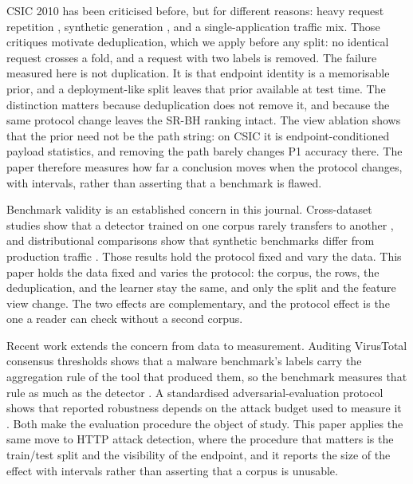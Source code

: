 \documentclass[preprint,11pt]{elsarticle}
\begin{document}
CSIC 2010 has been criticised before, but for different reasons: heavy
request repetition \citep{lamrani2022csic}, synthetic generation
\citep{sureda2022new}, and a single-application traffic mix. Those
critiques motivate deduplication, which we apply before any split: no
identical request crosses a fold, and a request with two labels is
removed. The failure measured here is not duplication. It is that
endpoint identity is a memorisable prior, and a deployment-like split
leaves that prior available at test time. The distinction matters
because deduplication does not remove it, and because the same protocol
change leaves the SR-BH ranking intact. The view ablation shows that the
prior need not be the path string: on CSIC it is endpoint-conditioned
payload statistics, and removing the path barely changes P1 accuracy
there. The paper therefore measures how far a conclusion moves when the
protocol changes, with intervals, rather than asserting that a benchmark
is flawed.

Benchmark validity is an established concern in this journal.
Cross-dataset studies show that a detector trained on one corpus rarely
transfers to another \citep{dhooge2020interdataset}, and distributional
comparisons show that synthetic benchmarks differ from production
traffic \citep{layeghy2024benchmarking}. Those results hold the protocol
fixed and vary the data. This paper holds the data fixed and varies the
protocol: the corpus, the rows, the deduplication, and the learner stay
the same, and only the split and the feature view change. The two
effects are complementary, and the protocol effect is the one a reader
can check without a second corpus.

Recent work extends the concern from data to measurement. Auditing
VirusTotal consensus thresholds shows that a malware benchmark's labels
carry the aggregation rule of the tool that produced them, so the
benchmark measures that rule as much as the detector
\citep{huynh2026auditing}. A standardised adversarial-evaluation
protocol shows that reported robustness depends on the attack budget
used to measure it \citep{gonzalez2026adversarial}. Both make the
evaluation procedure the object of study. This paper applies the same
move to HTTP attack detection, where the procedure that matters is the
train/test split and the visibility of the endpoint, and it reports the
size of the effect with intervals rather than asserting that a corpus is
unusable.
\end{document}
